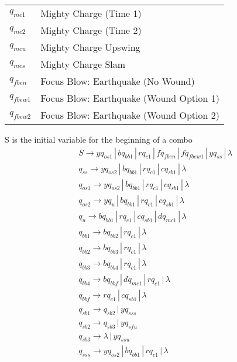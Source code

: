 \documentclass{article}
\begin{document}
\begin{mylist}
\begin{table}[h]
\begin{tabular}{l | l}
    $q_{mc1}$ & Mighty Charge (Time 1)\\
    $q_{mc2}$ & Mighty Charge (Time 2)\\
    $q_{mcu}$ & Mighty Charge Upswing\\
    $q_{mcs}$ & Mighty Charge Slam\\
    $q_{fben}$ & Focus Blow: Earthquake (No Wound)\\
    $q_{fbew1}$ & Focus Blow: Earthquake (Wound Option 1)\\
    $q_{fbew2}$ & Focus Blow: Earthquake (Wound Option 2)\\
  \end{tabular}
\end{table}
S is the initial variable for the beginning of a combo
\begin{align*}
&S \rightarrow yq_{os1} \, | \, bq_{bb1} \, | \, rq_{c1} \, | \, fq_{fben} \, | \, fq_{fbew1} \, | \, yq_{ss} \, | \, \lambda \\
&q_{ss} \rightarrow yq_{os2} \, | \, bq_{bb1} \, | \, rq_{c1} \, | \, cq_{sb1} \, | \, \lambda\\
&q_{os1} \rightarrow yq_{os2} \, | \, bq_{bb1} \, | \, rq_{c1} \, | \, cq_{sb1} \, | \, \lambda\\
&q_{os2} \rightarrow yq_{u} \, | \, bq_{bb1} \, | \, rq_{c1} \, | \, cq_{sb1} \, | \, \lambda\\
&q_{u} \rightarrow bq_{bb1} \, | \, rq_{c1} \, | \,cq_{sb1} \, | \, dq_{mc1} \, | \, \lambda\\
&q_{bb1} \rightarrow bq_{bb2} \, | \, rq_{c1} \, | \, \lambda \\ 
&q_{bb2} \rightarrow bq_{bb3} \, | \, rq_{c1} \, | \, \lambda \\ 
&q_{bb3} \rightarrow bq_{bb4} \, | \, rq_{c1} \, | \, \lambda \\ 
&q_{bb4} \rightarrow bq_{bbf} \, | \, dq_{mc1} \, | \, rq_{c1} \, | \, \lambda \\ 
&q_{bbf} \rightarrow rq_{c1} \, | \, cq_{sb1} \, | \, \lambda \\ 
&q_{sb1} \rightarrow q_{sb2} \, | \, yq_{sss} \\ 
&q_{sb2} \rightarrow q_{sb3} \, | \, yq_{sfu} \\ 
&q_{sb3} \rightarrow \lambda \, | \, yq_{ssu} \\ 
&q_{sss} \rightarrow yq_{os2} \, | \, bq_{bb1} \, | \, rq_{c1} \, | \, \lambda\\ 

\end{align*}
\end{mylist}
\end{document}

